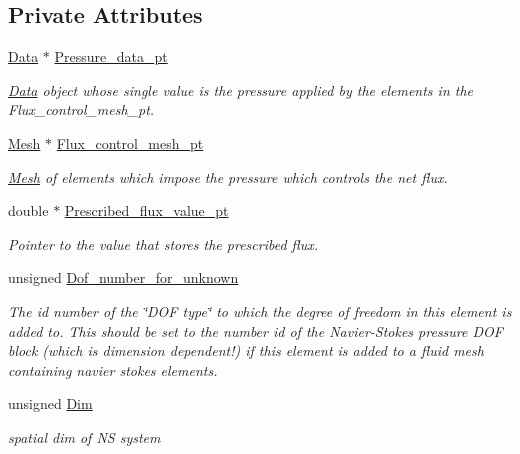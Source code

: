 \subsection*{Private Attributes}
\begin{DoxyCompactItemize}
\item 
\hyperlink{classoomph_1_1Data}{Data} $\ast$ \hyperlink{classoomph_1_1NetFluxControlElement_ae1c3f471f98f4c18f05c7a00a7c0489e}{Pressure\+\_\+data\+\_\+pt}
\begin{DoxyCompactList}\small\item\em \hyperlink{classoomph_1_1Data}{Data} object whose single value is the pressure applied by the elements in the Flux\+\_\+control\+\_\+mesh\+\_\+pt. \end{DoxyCompactList}\item 
\hyperlink{classoomph_1_1Mesh}{Mesh} $\ast$ \hyperlink{classoomph_1_1NetFluxControlElement_a38fc3c20ff284af95fdcd83527edd94f}{Flux\+\_\+control\+\_\+mesh\+\_\+pt}
\begin{DoxyCompactList}\small\item\em \hyperlink{classoomph_1_1Mesh}{Mesh} of elements which impose the pressure which controls the net flux. \end{DoxyCompactList}\item 
double $\ast$ \hyperlink{classoomph_1_1NetFluxControlElement_af3cf3627b1db5ad3303ef946efe5fc2f}{Prescribed\+\_\+flux\+\_\+value\+\_\+pt}
\begin{DoxyCompactList}\small\item\em Pointer to the value that stores the prescribed flux. \end{DoxyCompactList}\item 
unsigned \hyperlink{classoomph_1_1NetFluxControlElement_a80e84d97293e349064804d4141f3aeaf}{Dof\+\_\+number\+\_\+for\+\_\+unknown}
\begin{DoxyCompactList}\small\item\em The id number of the \char`\"{}\+D\+O\+F type\char`\"{} to which the degree of freedom in this element is added to. This should be set to the number id of the Navier-\/\+Stokes pressure D\+OF block (which is dimension dependent!) if this element is added to a fluid mesh containing navier stokes elements. \end{DoxyCompactList}\item 
unsigned \hyperlink{classoomph_1_1NetFluxControlElement_a1ae25acba7d703f73151e8977216eefc}{Dim}
\begin{DoxyCompactList}\small\item\em spatial dim of NS system \end{DoxyCompactList}\end{DoxyCompactItemize}

